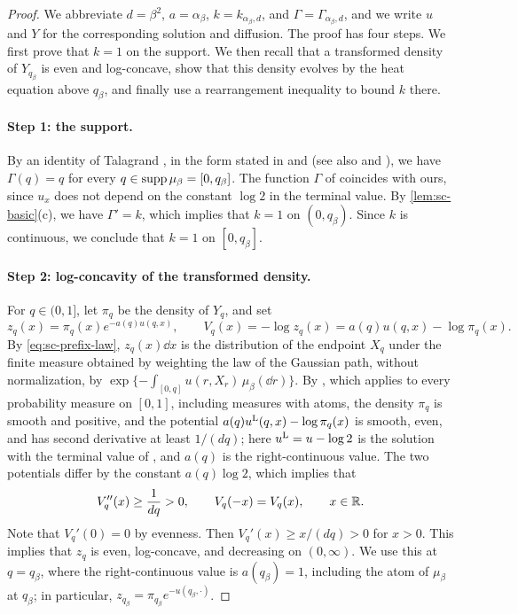 \begin{proof}
We abbreviate $d=\beta^2$, $a=\alpha_\beta$, $k=k_{\alpha_\beta,d}$,
and $\Gamma=\Gamma_{\alpha_\beta,d}$, and we write $u$ and $Y$ for the
corresponding solution and diffusion. The proof has four steps. We
first prove that $k=1$ on the support. We then recall that a
transformed density of $Y_{q_\beta}$ is even and log-concave, show that
this density evolves by the heat equation above $q_\beta$, and finally
use a rearrangement inequality to bound $k$ there.

\paragraph{Step 1: the support.}
By an identity of Talagrand \cite{Talagrand2006ParisiMeasures}, in the
form stated in \cite[Theorem~5]{AuffingerChen2015Properties} and
\cite[Lemma~2.6]{Lopatto} (see also
\cite[Proposition~1.1]{JagannathTobasco2017PhaseDiagram} and
\cite[Proposition~1]{Chen2017Variational}), we have $\Gamma(q)=q$ for
every $q\in\operatorname{supp}\mu_\beta=[0,q_\beta]$. The function $\Gamma$ of
\cite{Lopatto} coincides with ours, since $u_x$ does not depend on the constant
$\log2$ in the terminal value. By \cref{lem:sc-basic}(c), we have
$\Gamma'=k$, which implies that $k=1$ on $(0,q_\beta)$. Since $k$ is
continuous, we conclude that $k=1$ on $[0,q_\beta]$.

\paragraph{Step 2: log-concavity of the transformed density.}
For $q\in(0,1]$, let $\pi_q$ be the density of $Y_q$, and set
\[
 z_q(x)=\pi_q(x)e^{-a(q)u(q,x)},\qquad
 V_q(x)=-\log z_q(x)=a(q)u(q,x)-\log\pi_q(x).
\]
By \eqref{eq:sc-prefix-law}, $z_q(x)\dd x$ is the distribution of the endpoint
$X_q$ under the finite measure obtained by weighting the law of the
Gaussian path, without normalization, by
$\exp\{-\int_{[0,q]}u(r,X_r)\,\mu_\beta(\dd r)\}$. By
\cite[Proposition~4.1]{Lopatto}, which applies to every probability
measure on $[0,1]$, including measures with atoms, the density $\pi_q$
is smooth and positive, and the potential $a(q)u^{\rm L}(q,x)-\log\pi_q(x)$
is smooth, even, and has second derivative at least $1/(dq)$; here
$u^{\rm L}=u-\log2$ is the solution with the terminal value of
\cite{Lopatto}, and $a(q)$ is the right-continuous value. The two
potentials differ by the constant $a(q)\log2$, which implies that
\[
 V_q''(x)\ge\frac1{dq}>0,\qquad V_q(-x)=V_q(x),\qquad x\in\mathbb R .
\]
Note that $V_q'(0)=0$ by evenness. Then $V_q'(x)\ge x/(dq)>0$ for
$x>0$.
This implies that $z_q$ is even, log-concave, and decreasing on
$(0,\infty)$. We use this at $q=q_\beta$, where the right-continuous
value is $a(q_\beta)=1$, including the atom of $\mu_\beta$ at
$q_\beta$; in particular, $z_{q_\beta}=\pi_{q_\beta}e^{-u(q_\beta,\cdot)}$.


\end{proof}
